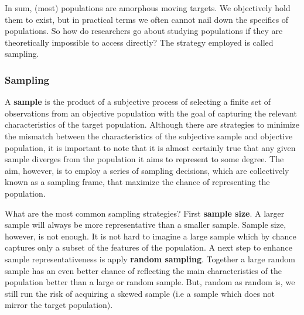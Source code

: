 \documentclass[
]{article}
\begin{document}
In sum, (most) populations are amorphous moving targets. We objectively hold them to exist, but in practical terms we often cannot nail down the specifics of populations. So how do researchers go about studying populations if they are theoretically impossible to access directly? The strategy employed is called sampling.

\hypertarget{sampling}{%
\subsubsection{Sampling}\label{sampling}}

A \textbf{sample} is the product of a subjective process of selecting a finite set of observations from an objective population with the goal of capturing the relevant characteristics of the target population. Although there are strategies to minimize the mismatch between the characteristics of the subjective sample and objective population, it is important to note that it is almost certainly true that any given sample diverges from the population it aims to represent to some degree. The aim, however, is to employ a series of sampling decisions, which are collectively known as a sampling frame, that maximize the chance of representing the population.

What are the most common sampling strategies? First \textbf{sample size}. A larger sample will always be more representative than a smaller sample. Sample size, however, is not enough. It is not hard to imagine a large sample which by chance captures only a subset of the features of the population. A next step to enhance sample representativeness is apply \textbf{random sampling}. Together a large random sample has an even better chance of reflecting the main characteristics of the population better than a large or random sample. But, random as random is, we still run the risk of acquiring a skewed sample (i.e a sample which does not mirror the target population).
\end{document}
